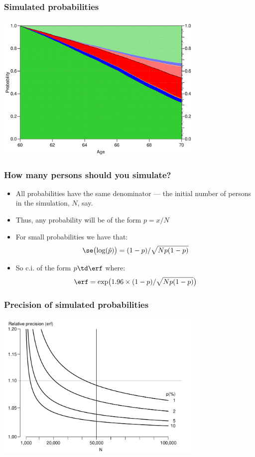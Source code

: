 \begin{frame}
   \frametitle{Simulated probabilities}
\includegraphics[width=0.75\textwidth]{./GbAd-probs.pdf}
\end{frame}

\begin{frame}
   \frametitle{How many persons should you simulate?}
\pause
   \begin{itemize}[<+->]
   \item All probabilities have the same denominator --- the initial
     number of persons in the simulation, $N$, say.
   \item Thus, any probability will be of the form $p=x/N$
   \item For small probabilities we have that:
\[
 \se\bigl(\log(\hat p)\bigr) = (1-p)/\sqrt{N p (1-p)}
\]
\item So c.i. of the form $p\td \erf$ where:
\[
 \erf = \exp\bigl( 1.96 \times (1-p)/\sqrt{N p (1-p)} \bigr)
\]
   \end{itemize}
\end{frame}

\begin{frame}
   \frametitle{Precision of simulated probabilities}
\includegraphics[width=0.75\textwidth]{./se-probs.pdf}
\end{frame}

